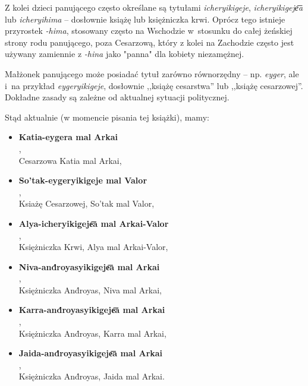 \begin{spacing}{1.1}
Z kolei dzieci panującego często określane są tytułami \emph{icheryikigeje},
\emph{icheryikigeje͞a} lub \emph{icheryihima} -- dosłownie książę lub
księżniczka krwi. Oprócz tego istnieje przyrostek \emph{-hima}, stosowany często
na Wschodzie w~stosunku do całej żeńskiej strony rodu panującego, poza
Cesarzową, który z kolei na Zachodzie często jest używany zamiennie z
\emph{-hina} jako "panna" dla kobiety niezamężnej.

Małżonek panującego może posiadać tytuł zarówno równorzędny -- np. \emph{eyger},
ale i~na przykład \emph{eygeryikigeje}, dosłownie ,,książę cesarstwa'' lub
,,książę cesarzowej''. Dokładne zasady są zależne od aktualnej sytuacji
politycznej.

Stąd aktualnie (w momencie pisania tej książki), mamy:

\begin{itemize}
\item \textbf{Katia-eygera mal Arkai}\\ ,\\ 
Cesarzowa Katia mal Arkai,
\item \textbf{So'tak-eygeryikigeje mal Valor}\\ ,\\ Ksiażę Cesarzowej, So'tak mal Valor,
\item \textbf{Alya-icheryikigeje͞a mal Arkai-Valor}\\,\\ Księżniczka Krwi, Alya mal Arkai-Valor,
\item \textbf{Niva-and́royasyikigeje͞a mal Arkai}\\,\\ Księżniczka And́royas, Niva mal Arkai,
\item \textbf{Karra-and́royasyikigeje͞a mal Arkai}\\,\\ Księżniczka And́royas, Karra mal Arkai,
\item \textbf{Jaida-and́royasyikigeje͞a mal Arkai}\\,\\ Księżniczka And́royas, Jaida mal Arkai.
\end{itemize}



\end{spacing}
